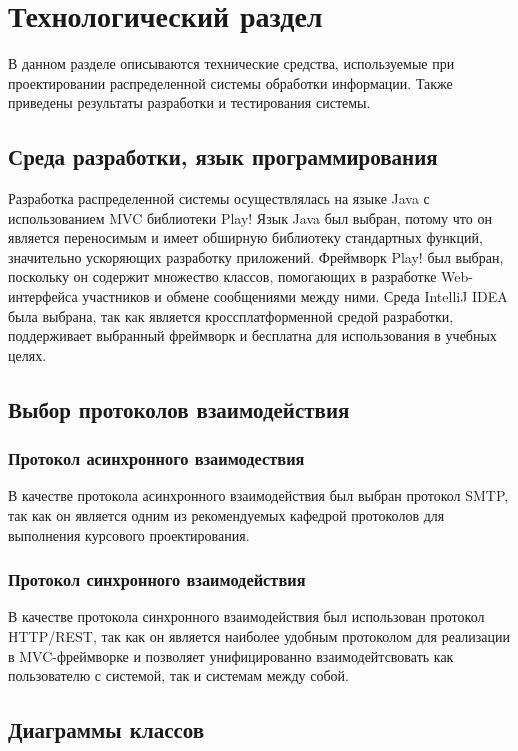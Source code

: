 \chapter{Технологический раздел}
\label{cha:impl}

В данном разделе описываются технические средства,  используемые при проектировании распределенной системы обработки информации. Также приведены результаты разработки и тестирования системы. 

\section{Среда разработки, язык программирования}
Разработка распределенной системы осуществлялась на языке Java с использованием MVC библиотеки Play!
Язык Java был выбран, потому что он является переносимым и имеет обширную библиотеку стандартных функций, значительно ускоряющих разработку приложений. Фреймворк Play! был выбран, поскольку он содержит множество классов, помогающих в разработке Web-интерфейса участников и обмене сообщениями между ними. Среда IntelliJ IDEA была выбрана, так как является кроссплатформенной средой разработки, поддерживает выбранный фреймворк и бесплатна для использования в учебных целях.

\section{Выбор протоколов взаимодействия}

\subsection{Протокол асинхронного взаимодествия}

В качестве протокола асинхронного взаимодействия был выбран протокол SMTP, так как он является одним из рекомендуемых кафедрой протоколов для выполнения курсового проектирования.

\subsection{Протокол синхронного взаимодействия}

В качестве протокола синхронного взаимодействия был использован протокол HTTP/REST, так как он является наиболее удобным протоколом для реализации в MVC-фреймворке и позволяет унифицированно взаимодейтсвовать как пользователю с системой, так и системам между собой.

\section{Диаграммы классов}

